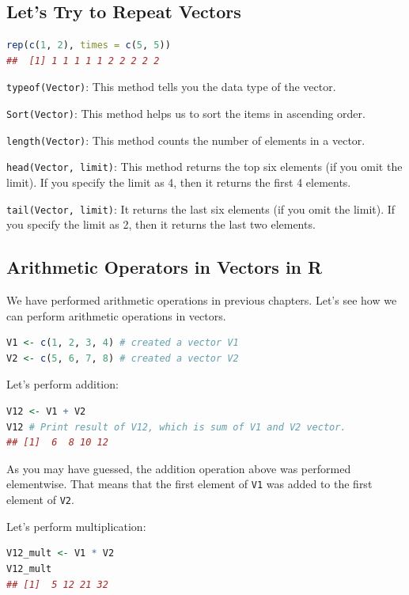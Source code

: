 \documentclass[10pt]{book}
\begin{document}
\subsection{Let’s Try to Repeat Vectors}
\begin{lstlisting}[language=R]
rep(c(1, 2), times = c(5, 5))
##  [1] 1 1 1 1 1 2 2 2 2 2
\end{lstlisting}

\texttt{typeof(Vector)}: This method tells you the data type of the vector.

\texttt{Sort(Vector)}: This method helps us to sort the items in ascending order.

\texttt{length(Vector)}: This method counts the number of elements in a vector.

\texttt{head(Vector, limit)}: This method returns the top six elements (if you omit the limit). If you specify the limit as 4, then it returns the first 4 elements.

\texttt{tail(Vector, limit)}: It returns the last six elements (if you omit the limit). If you specify the limit as 2, then it returns the last two elements.

\subsection{Arithmetic Operators in Vectors in R}

We have performed arithmetic operations in previous chapters. Let’s see how we can perform arithmetic operations in vectors.

\begin{lstlisting}[language=R]
V1 <- c(1, 2, 3, 4) # created a vector V1 
V2 <- c(5, 6, 7, 8) # created a vector V2
\end{lstlisting}

Let's perform addition:
\begin{lstlisting}[language=R]
V12 <- V1 + V2
V12 # Print result of V12, which is sum of V1 and V2 vector.
## [1]  6  8 10 12
\end{lstlisting}

As you may have guessed, the addition operation above was performed elementwise. That means that the first element of \texttt{V1} was added to the first element of \texttt{V2}.

Let’s perform multiplication:
\begin{lstlisting}[language=R]
V12_mult <- V1 * V2
V12_mult
## [1]  5 12 21 32
\end{lstlisting}
\end{document}
